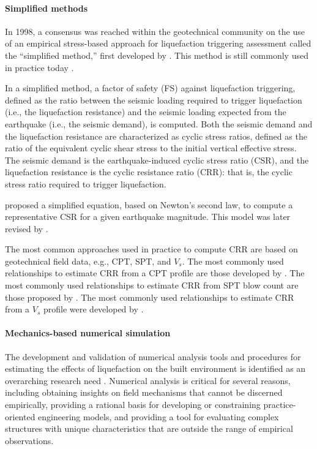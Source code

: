 \paragraph{Simplified methods} 
In 1998, a consensus was reached within the geotechnical community on the use of an empirical stress-based approach for liquefaction triggering assessment called the ``simplified method,'' first developed by \citet{seed1971simplified}. This method is still commonly used in practice today \citep{youd2001liquefaction, national2016state}.

In a simplified method, a factor of safety (FS) against liquefaction triggering, defined as the ratio between the seismic loading required to trigger liquefaction (i.e., the liquefaction resistance) and the seismic loading expected from the earthquake (i.e., the seismic demand), is computed. Both the seismic demand and the liquefaction resistance are characterized as cyclic stress ratios, defined as the ratio of the equivalent cyclic shear stress to the initial vertical effective stress. The seismic demand is the earthquake-induced cyclic stress ratio (CSR), and the liquefaction resistance is the cyclic resistance ratio (CRR): that is, the cyclic stress ratio required to trigger liquefaction. 

\citet{seed1971simplified} proposed a simplified equation, based on Newton's second law, to compute a representative CSR for a given earthquake magnitude. This model was later revised by \citet{idriss1999update, cetin2004nonlinear, idriss2008soil, boulanger2014cpt}.

The most common approaches used in practice to compute CRR are based on geotechnical field data, e.g., CPT, SPT, and $V_s$. The most commonly used relationships to estimate CRR from a CPT profile are those developed by \citet{robertson1998evaluating, moss2006cpt, idriss2008soil, robertson2009interpretation}. The most commonly used relationships to estimate CRR from SPT blow count are those proposed by \citet{youd2001liquefaction, boulanger2014cpt, cetin2018sptbased}. The most commonly used relationships to estimate CRR from a $V_s$ profile were developed by \citet{andrus2000liquefaction, kayen2013shearwave}.

\paragraph{Mechanics-based numerical simulation} The development and validation of numerical analysis tools and procedures for estimating the effects of liquefaction on the built environment is identified as an overarching research need \citep{bray2017new}. Numerical analysis is critical for several reasons, including obtaining insights on field mechanisms that cannot be discerned empirically, providing a rational basis for developing or constraining practice-oriented engineering models, and providing a tool for evaluating complex structures with unique characteristics that are outside the range of empirical observations. 

